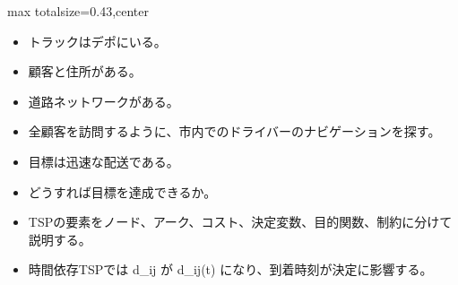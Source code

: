 \clearpage
{}
\begin{minipage}[t]{0.405\textwidth}
\begin{adjustbox}{max totalsize={\textwidth}{0.43\textheight},center}
\begin{minipage}{\textwidth}\scriptsize
{}\begin{itemize}
\item トラックはデポにいる。
\item 顧客と住所がある。
\item 道路ネットワークがある。
\item 全顧客を訪問するように、市内でのドライバーのナビゲーションを探す。
\item 目標は迅速な配送である。
\item どうすれば目標を達成できるか。
\end{itemize}\begin{itemize}
\item TSPの要素をノード、アーク、コスト、決定変数、目的関数、制約に分けて説明する。
\item 時間依存TSPでは d\_ij が d\_ij(t) になり、到着時刻が決定に影響する。
\end{itemize}
\end{minipage}
\end{adjustbox}
\end{minipage}\hfill
